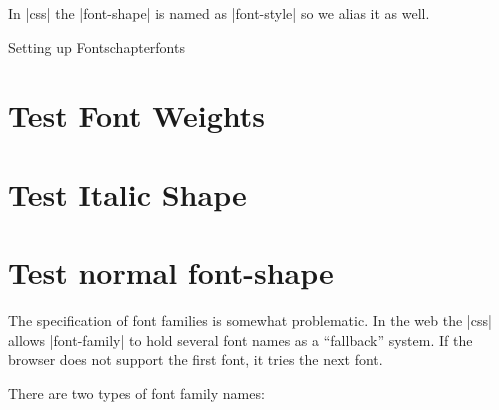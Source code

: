 \begin{decription}
In |css| the |font-shape| is named as |font-style| so we alias it as well. 



\begin{texexample}{Setting up Fonts}{chapterfonts}
\chapter[fonts]{Test Font Weights}
\lorem
{}
\chapter{Test Italic Shape}
\lorem
{}
\chapter{Test normal font-shape}
\lorem
\end{texexample}



The specification of font families is somewhat problematic. In the web the |css| allows |font-family|  to hold several font names as a ``fallback” system. If the browser does not support the first font, it tries the next font.

There are two types of font family names:


\end{decription}
